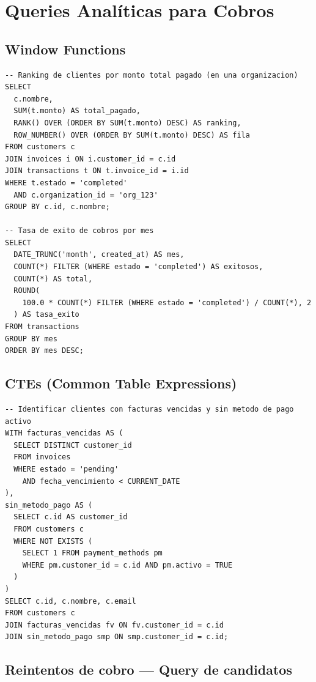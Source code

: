 \documentclass[11pt,a4paper]{article}
\begin{document}
\section{Queries Analíticas para Cobros}

\subsection{Window Functions}

\begin{lstlisting}[style=sql]
-- Ranking de clientes por monto total pagado (en una organizacion)
SELECT
  c.nombre,
  SUM(t.monto) AS total_pagado,
  RANK() OVER (ORDER BY SUM(t.monto) DESC) AS ranking,
  ROW_NUMBER() OVER (ORDER BY SUM(t.monto) DESC) AS fila
FROM customers c
JOIN invoices i ON i.customer_id = c.id
JOIN transactions t ON t.invoice_id = i.id
WHERE t.estado = 'completed'
  AND c.organization_id = 'org_123'
GROUP BY c.id, c.nombre;

-- Tasa de exito de cobros por mes
SELECT
  DATE_TRUNC('month', created_at) AS mes,
  COUNT(*) FILTER (WHERE estado = 'completed') AS exitosos,
  COUNT(*) AS total,
  ROUND(
    100.0 * COUNT(*) FILTER (WHERE estado = 'completed') / COUNT(*), 2
  ) AS tasa_exito
FROM transactions
GROUP BY mes
ORDER BY mes DESC;
\end{lstlisting}

\subsection{CTEs (Common Table Expressions)}

\begin{lstlisting}[style=sql]
-- Identificar clientes con facturas vencidas y sin metodo de pago activo
WITH facturas_vencidas AS (
  SELECT DISTINCT customer_id
  FROM invoices
  WHERE estado = 'pending'
    AND fecha_vencimiento < CURRENT_DATE
),
sin_metodo_pago AS (
  SELECT c.id AS customer_id
  FROM customers c
  WHERE NOT EXISTS (
    SELECT 1 FROM payment_methods pm
    WHERE pm.customer_id = c.id AND pm.activo = TRUE
  )
)
SELECT c.id, c.nombre, c.email
FROM customers c
JOIN facturas_vencidas fv ON fv.customer_id = c.id
JOIN sin_metodo_pago smp ON smp.customer_id = c.id;
\end{lstlisting}

\subsection{Reintentos de cobro — Query de candidatos}
\end{document}
